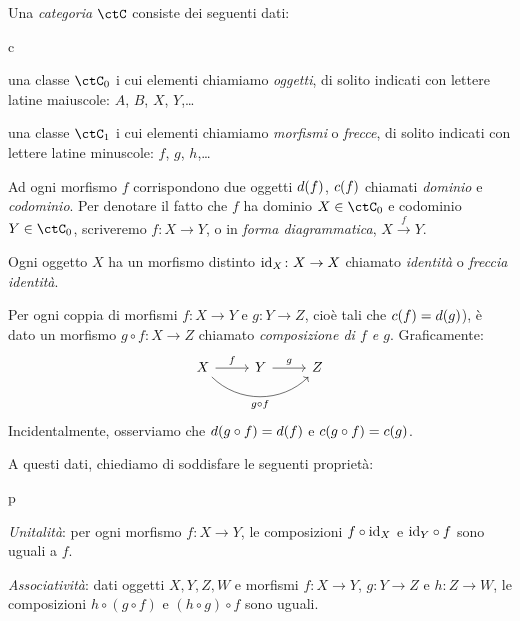 \begin{definition}[Categoria]
 Una \emph{categoria} $\ctC$ consiste dei seguenti dati:
 \begin{enumtag}{c}
  \item\label{c_1} una classe $\ctC_0$ i cui elementi chiamiamo \emph{oggetti}, di solito indicati con lettere latine maiuscole: $A$, $B$, $X$, $Y$,\dots
  \item\label{c_2} una classe $\ctC_1$ i cui elementi chiamiamo \emph{morfismi} o \emph{frecce}, di solito indicati con lettere latine minuscole: $f$, $g$, $h$,\dots
  \item\label{c_3} Ad ogni morfismo $f$ corrispondono due oggetti $d(f)$, $c(f)$ chiamati \emph{dominio} e \emph{codominio}. Per denotare il fatto che $f$ ha dominio $X\in\ctC_0$ e codominio $Y\in\ctC_0$, scriveremo $f\colon X\to Y$, o in \emph{forma diagrammatica}, $X \xrightarrow{f} Y$.
  \item\label{c_4} Ogni oggetto $X$ ha un morfismo distinto $\mathrm{id}_X\colon X\to X$ chiamato \emph{identità} o \emph{freccia identità}.
  \item\label{c_5} Per ogni coppia di morfismi $f\colon X\to Y$ e $g\colon Y\to Z$, cioè tali che $c(f)=d(g)$), è dato un morfismo $g\circ f:X\to Z$ chiamato \emph{composizione di $f$ e $g$}. Graficamente:
  \[
  \begin{tikzcd}
   X \ar{r}{f}
   \ar[rounded corners,out=-45, in=225]{rr}[swap]{g\circ f}
   & Y \ar{r}{g} & Z \\
   &&
  \end{tikzcd}
  \]
Incidentalmente, osserviamo che $d(g\circ f)=d(f)$ e $c(g\circ f)=c(g)$.
\end{enumtag}
  A questi dati, chiediamo di soddisfare le seguenti proprietà:
\begin{enumtag}{p}
  \item \label{p_1} \emph{Unitalità}: per ogni morfismo $f:X\to Y$, le composizioni $f\circ\mathrm{id}_X$ e $\mathrm{id}_Y\circ f$ sono uguali a $f$.
  \item \label{p_2} \emph{Associatività}: dati oggetti $X,Y,Z,W$ e morfismi $f\colon X\to Y$, $g\colon Y\to Z$ e $h\colon Z\to W$, le composizioni $h\circ (g\circ f)$ e $(h\circ g)\circ f$ sono uguali.
 \end{enumtag}
\end{definition}
